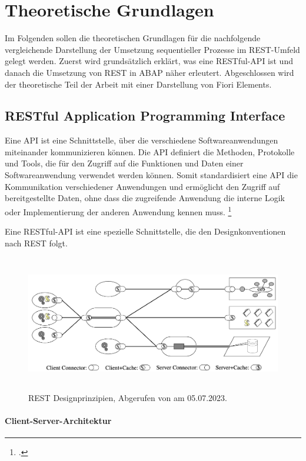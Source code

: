 \chapter{Theoretische Grundlagen}

Im Folgenden sollen die theoretischen Grundlagen für die nachfolgende vergleichende Darstellung der Umsetzung sequentieller Prozesse im REST-Umfeld gelegt werden. Zuerst wird grundsätzlich erklärt, was eine RESTful-API ist und danach die Umsetzung von REST in ABAP näher erleutert. Abgeschlossen wird der theoretische Teil der Arbeit mit einer Darstellung von Fiori Elements.

\section{RESTful Application Programming Interface}

Eine API ist eine Schnittstelle, über die verschiedene Softwareanwendungen miteinander kommunizieren können. Die API definiert die Methoden, Protokolle und Tools, die für den Zugriff auf die Funktionen und Daten einer Softwareanwendung verwendet werden können. Somit standardisiert eine API die Kommunikation verschiedener Anwendungen und ermöglicht den Zugriff auf bereitgestellte Daten, ohne dass die zugreifende Anwendung die interne Logik oder Implementierung der anderen Anwendung kennen muss. \footcite[Vgl.][S. 15ff]{biehl_api_2015}

Eine RESTful-API ist eine spezielle Schnittstelle, die den Designkonventionen nach REST folgt.

\begin{figure}[H]
 \centering
 \includegraphics[height=5.95cm]{Bilder/REST_Rest.png}
 \caption[REST Designprinzipien]{REST Designprinzipien, Abgerufen von \cite{fielding_architectural_2000} am 05.07.2023.}
 \label{fig:iso_norm}
\end{figure}

\subsubsection{Client-Server-Architektur}


